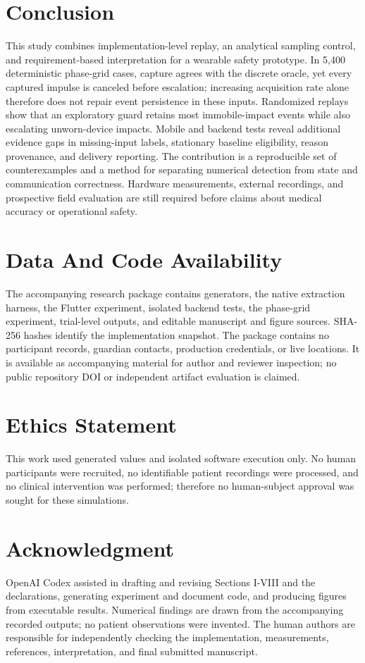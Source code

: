 \documentclass[journal]{IEEEtran}
\begin{document}
\section{Conclusion}
This study combines implementation-level replay, an analytical sampling control, and requirement-based interpretation for a wearable safety prototype. In 5,400 deterministic phase-grid cases, capture agrees with the discrete oracle, yet every captured impulse is canceled before escalation; increasing acquisition rate alone therefore does not repair event persistence in these inputs. Randomized replays show that an exploratory guard retains most immobile-impact events while also escalating unworn-device impacts. Mobile and backend tests reveal additional evidence gaps in missing-input labels, stationary baseline eligibility, reason provenance, and delivery reporting. The contribution is a reproducible set of counterexamples and a method for separating numerical detection from state and communication correctness. Hardware measurements, external recordings, and prospective field evaluation are still required before claims about medical accuracy or operational safety.

\section*{Data And Code Availability}
The accompanying research package contains generators, the native extraction harness, the Flutter experiment, isolated backend tests, the phase-grid experiment, trial-level outputs, and editable manuscript and figure sources. SHA-256 hashes identify the implementation snapshot. The package contains no participant records, guardian contacts, production credentials, or live locations. It is available as accompanying material for author and reviewer inspection; no public repository DOI or independent artifact evaluation is claimed.

\section*{Ethics Statement}
This work used generated values and isolated software execution only. No human participants were recruited, no identifiable patient recordings were processed, and no clinical intervention was performed; therefore no human-subject approval was sought for these simulations.

\section*{Acknowledgment}
OpenAI Codex assisted in drafting and revising Sections I-VIII and the declarations, generating experiment and document code, and producing figures from executable results. Numerical findings are drawn from the accompanying recorded outputs; no patient observations were invented. The human authors are responsible for independently checking the implementation, measurements, references, interpretation, and final submitted manuscript.
\end{document}
